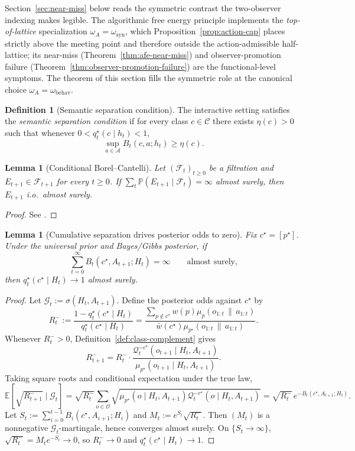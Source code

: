 \documentclass[11pt]{article}
\newtheorem{lemma}[theorem]{Lemma}
\theoremstyle{definition}
\newtheorem{definition}[theorem]{Definition}
\theoremstyle{remark}
\newcommand{\Acal}{\mathcal{A}}
\newcommand{\Ccal}{\mathcal{C}}
\newcommand{\Ocal}{\mathcal{O}}
\newcommand{\Qcal}{\mathcal{Q}}
\newcommand{\E}{\mathbb{E}}
\newcommand{\Prob}{\mathbb{P}}
\newcommand{\givena}{\,\|\,}
\begin{document}
Section~\ref{sec:near-miss} below reads the symmetric contrast the two-observer indexing makes legible. The algorithmic free energy principle implements the \emph{top-of-lattice} specialization $\omega_A=\omega_{\mathrm{syn}}$, which Proposition~\ref{prop:action-cap} places strictly above the meeting point and therefore outside the action-admissible half-lattice; its near-miss (Theorem~\ref{thm:afe-near-miss}) and observer-promotion failure (Theorem~\ref{thm:observer-promotion-failure}) are the functional-level symptoms. The theorem of this section fills the symmetric role at the canonical choice $\omega_A=\omega_{\mathrm{behav}}$.

\begin{definition}[Semantic separation condition]
\label{def:sep-condition}
The interactive setting satisfies the \emph{semantic separation condition} if for every class $c\in\Ccal$ there exists $\eta(c)>0$ such that whenever $0<q_t^\star(c\mid h_t)<1$,
\[
\sup_{a\in\Acal}B_t(c,a;h_t)\ge \eta(c).
\]
\end{definition}

\begin{lemma}[Conditional Borel--Cantelli]
\label{lem:conditional-bc}
Let $(\mathcal{F}_t)_{t\ge 0}$ be a filtration and $E_{t+1}\in\mathcal{F}_{t+1}$ for every $t\ge 0$. If $\sum_t\Prob(E_{t+1}\mid\mathcal{F}_t)=\infty$ almost surely, then $E_{t+1}$ i.o.\ almost surely.
\end{lemma}

\begin{proof}
See \citet[Chapter~12]{Williams1991}.
\end{proof}

\begin{lemma}[Cumulative separation drives posterior odds to zero]
\label{lem:contraction}
Fix $c^\star=[p^\star]$. Under the universal prior and Bayes/Gibbs posterior, if
\[
\sum_{t=0}^{\infty}B_t(c^\star,A_{t+1};H_t)=\infty
\qquad
\text{almost surely,}
\]
then $q_t^\star(c^\star\mid H_t)\to 1$ almost surely.
\end{lemma}

\begin{proof}
Let $\mathcal{G}_t:=\sigma(H_t,A_{t+1})$. Define the posterior odds against $c^\star$ by
\[
R_t^-:=\frac{1-q_t^\star(c^\star\mid H_t)}{q_t^\star(c^\star\mid H_t)}
=\frac{\sum_{p\notin c^\star}w(p)\mu_p(o_{1:t}\givena a_{1:t})}
      {\bar w(c^\star)\mu_{p^\star}(o_{1:t}\givena a_{1:t})}.
\]
Whenever $R_t^->0$, Definition~\ref{def:class-complement} gives
\[
R_{t+1}^-=R_t^-\cdot\frac{\Qcal_t^{-c^\star}(o_{t+1}\mid H_t,A_{t+1})}{\mu_{p^\star}(o_{t+1}\mid H_t,A_{t+1})}.
\]
Taking square roots and conditional expectation under the true law,
\[
\E\!\left[\sqrt{R_{t+1}^-}\mid\mathcal{G}_t\right]
=
\sqrt{R_t^-}\sum_{o\in\Ocal}\sqrt{\mu_{p^\star}(o\mid H_t,A_{t+1})\Qcal_t^{-c^\star}(o\mid H_t,A_{t+1})}
=
\sqrt{R_t^-}\,e^{-B_t(c^\star,A_{t+1};H_t)}.
\]
Let $S_t:=\sum_{i=0}^{t-1}B_i(c^\star,A_{i+1};H_i)$ and $M_t:=e^{S_t}\sqrt{R_t^-}$. Then $(M_t)$ is a nonnegative $\mathcal{G}_t$-martingale, hence converges almost surely. On $\{S_t\to\infty\}$, $\sqrt{R_t^-}=M_te^{-S_t}\to 0$, so $R_t^-\to 0$ and $q_t^\star(c^\star\mid H_t)\to 1$.
\end{proof}
\end{document}
